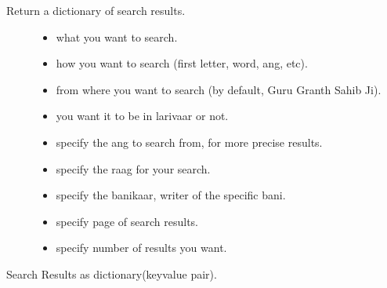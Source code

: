 \documentclass[letterpaper,10pt,english]{sphinxmanual}
\begin{document}
\sphinxAtStartPar
Return a dictionary of search results.
\begin{description}
\item[{}] \leavevmode\begin{itemize}
\item {} 
\sphinxAtStartPar
{}  \textendash{} what you want to search.

\item {} 
\sphinxAtStartPar
{}  \textendash{} how you want to search (first letter, word, ang, etc).

\item {} 
\sphinxAtStartPar
{}  \textendash{} from where you want to search (by default, Guru Granth Sahib Ji).

\item {} 
\sphinxAtStartPar
{}  \textendash{} you want it to be in larivaar or not.

\item {} 
\sphinxAtStartPar
{}  \textendash{} specify the ang to search from, for more precise results.

\item {} 
\sphinxAtStartPar
{}  \textendash{} specify the raag for your search.

\item {} 
\sphinxAtStartPar
{}  \textendash{} specify the banikaar, writer of the specific bani.

\item {} 
\sphinxAtStartPar
{}  \textendash{} specify page of search results.

\item {} 
\sphinxAtStartPar
{}  \textendash{} specify number of results you want.

\end{itemize}

\end{description}

\sphinxAtStartPar
{}    Search Results as dictionary(key\sphinxhyphen{}value pair).
\end{document}
